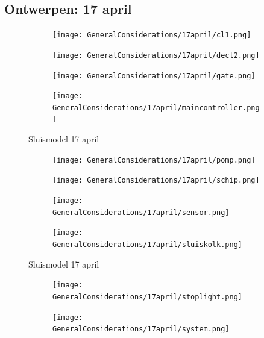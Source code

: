 \documentclass{article}
\begin{document}
	\subsection{Ontwerpen: 17 april}
	\begin{figure}
		\centering
		\begin{subfigure}{0.45\linewidth}
			\texttt{[image: GeneralConsiderations/17april/cl1.png]}
			\caption{}
			\label{fig:1a}
		\end{subfigure}\hfill
		\begin{subfigure}{0.45\linewidth}
			\texttt{[image: GeneralConsiderations/17april/decl2.png]}
			\caption{}
			\label{fig:1a}
		\end{subfigure}
		
		\begin{subfigure}{0.45\linewidth}
			\texttt{[image: GeneralConsiderations/17april/gate.png]}
			\caption{}
			\label{fig:1a}
		\end{subfigure}\hfill
		\begin{subfigure}{0.45\linewidth}
			\texttt{[image: GeneralConsiderations/17april/maincontroller.png]}
			\caption{}
			\label{fig:1a}
		\end{subfigure}
		\caption{Sluismodel 17 april}
		\label{fig:1}
	\end{figure}
	\begin{figure}
		\centering
		\begin{subfigure}{0.45\linewidth}
			\texttt{[image: GeneralConsiderations/17april/pomp.png]}
			\caption{}
			\label{fig:1a}
		\end{subfigure}\hfill
		\begin{subfigure}{0.45\linewidth}
			\texttt{[image: GeneralConsiderations/17april/schip.png]}
			\caption{}
			\label{fig:1a}
		\end{subfigure}
		
		\begin{subfigure}{0.45\linewidth}
			\texttt{[image: GeneralConsiderations/17april/sensor.png]}
			\caption{}
			\label{fig:1a}
		\end{subfigure}\hfill
		\begin{subfigure}{0.45\linewidth}
			\texttt{[image: GeneralConsiderations/17april/sluiskolk.png]}
			\caption{}
			\label{fig:1a}
		\end{subfigure}
		\caption{Sluismodel 17 april}
		\label{fig:1}
	\end{figure}
	
	\begin{figure}
		\centering
		\begin{subfigure}{0.45\linewidth}
			\texttt{[image: GeneralConsiderations/17april/stoplight.png]}
			\caption{}
			\label{fig:1a}
		\end{subfigure}\hfill
		\begin{subfigure}{0.45\linewidth}
			\texttt{[image: GeneralConsiderations/17april/system.png]}
			\caption{}
			\label{fig:1a}
		\end{subfigure}
	\end{figure}
	\newpage
\end{document}
